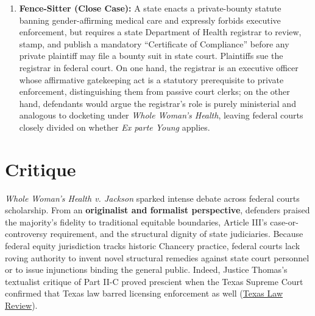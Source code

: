 \documentclass[12pt]{article}
\begin{document}
\begin{enumerate}
    \item \textbf{Fence-Sitter (Close Case):} A state enacts a private-bounty statute banning gender-affirming medical care and expressly forbids executive enforcement, but requires a state Department of Health registrar to review, stamp, and publish a mandatory ``Certificate of Compliance'' before any private plaintiff may file a bounty suit in state court. Plaintiffs sue the registrar in federal court. On one hand, the registrar is an executive officer whose affirmative gatekeeping act is a statutory prerequisite to private enforcement, distinguishing them from passive court clerks; on the other hand, defendants would argue the registrar's role is purely ministerial and analogous to docketing under \textit{Whole Woman's Health}, leaving federal courts closely divided on whether \textit{Ex parte Young} applies.
\end{enumerate}

\section{Critique}

\textit{Whole Woman's Health v. Jackson} sparked intense debate across federal courts scholarship. From an \textbf{originalist and formalist perspective}, defenders praised the majority's fidelity to traditional equitable boundaries, Article III's case-or-controversy requirement, and the structural dignity of state judiciaries. Because federal equity jurisdiction tracks historic Chancery practice, federal courts lack roving authority to invent novel structural remedies against state court personnel or to issue injunctions binding the general public. Indeed, Justice Thomas's textualist critique of Part II-C proved prescient when the Texas Supreme Court confirmed that Texas law barred licensing enforcement as well (\href{https://texaslawreview.org/judicial-review-of-unconventional-enforcement-regimes/}{Texas Law Review}).
\end{document}
